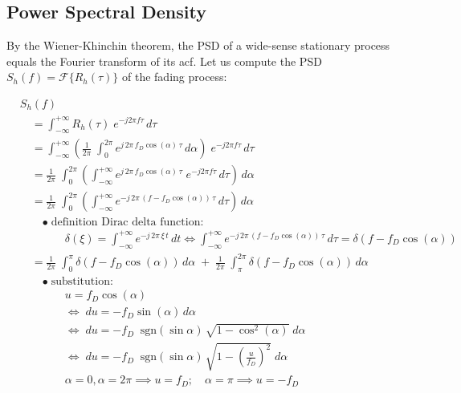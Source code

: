 \subsection*{Power Spectral Density}
\label{appendix_section:psd_jakes_model}

By the Wiener-Khinchin theorem, the \ac{PSD} of a wide-sense stationary process equals the Fourier transform of its \ac{acf}.
Let us compute the \ac{PSD} $S_h(f) = \mathcal{F}\{R_h(\tau)\}$ of the fading process:
\begin{fleqn}[0em]
\begin{align*}
    &S_h(f) \\
    &\quad= \int_{-\infty}^{+\infty} R_h(\tau) \; e^{-j 2 \pi f \tau} \, d\tau \\
    &\quad= \int_{-\infty}^{+\infty} \left( \frac{1}{2\pi} \; \int_{0}^{2\pi} e^{j \, 2\pi \, f_D \cos(\alpha) \, \tau} \, d\alpha \right) \; e^{-j 2 \pi f \tau} \, d\tau \\
    &\quad= \frac{1}{2\pi} \; \int_{0}^{2\pi} \left(\int_{-\infty}^{+\infty} e^{j \, 2\pi \, f_D \cos(\alpha) \, \tau} \; e^{-j 2 \pi f \tau} \, d\tau \right) \, d\alpha \\
    &\quad= \frac{1}{2\pi} \; \int_{0}^{2\pi} \left(\int_{-\infty}^{+\infty} e^{-j \, 2\pi \, (f - f_D \cos(\alpha)) \, \tau} \, d\tau \right) \, d\alpha \\
    & \qquad \bullet \; \text{definition Dirac delta function: } \\
    & \qquad \qquad\delta(\xi) = \int_{-\infty}^{+\infty} e^{-j \, 2\pi \, \xi \, t} \, dt \iff \int_{-\infty}^{+\infty} e^{-j \, 2\pi \, (f - f_D \cos(\alpha)) \, \tau} \, d\tau = \delta(f - f_D \cos(\alpha)) \\
    &\quad= \frac{1}{2\pi} \; \int_{0}^{\pi} \delta(f - f_D \cos(\alpha)) \, d\alpha \; + \; \frac{1}{2\pi} \; \int_{\pi}^{2\pi} \delta(f - f_D \cos(\alpha)) \, d\alpha \\ 
    & \qquad \bullet \; \text{substitution: } \\
    & \qquad \qquad u = f_D \cos(\alpha) \\
    & \qquad \qquad \Leftrightarrow \; du = -f_D \sin(\alpha) \, d\alpha  \\
    & \qquad \qquad \Leftrightarrow \; du = -f_D \; \; \text{sgn}(\sin\alpha) \, \sqrt{1 - \cos^2(\alpha)} \; d\alpha \\
    & \qquad \qquad \Leftrightarrow \;du = -f_D \; \; \text{sgn}(\sin\alpha) \, \sqrt{1 - (\frac{u}{f_D})^2} \; d\alpha \\
    & \qquad \qquad \alpha = 0, \alpha = 2\pi \implies u = f_D; \quad \alpha = \pi \implies u = -f_D \\

\end{align*}
\end{fleqn}
